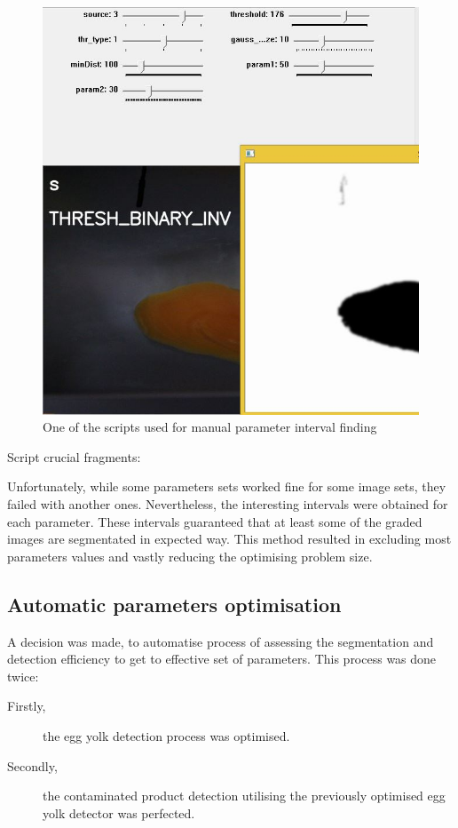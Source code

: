 \documentclass[12pt,twoside,a4paper]{article}
\begin{document}
\begin{figure}[H]
\centering
\includegraphics[width=0.5\paperwidth]{manual}
\caption{One of the scripts used for manual parameter interval finding}\label{fig:manual}
\end{figure}

Script crucial fragments:


Unfortunately, while some parameters sets worked fine for some image sets, they failed with another ones.
Nevertheless, the interesting intervals were obtained for each parameter. These intervals guaranteed that at least some of the graded images are segmentated in expected way.
This method resulted in excluding most parameters values and vastly reducing the optimising problem size.

\subsection{Automatic parameters optimisation}

A decision was made, to automatise process of assessing the segmentation and detection efficiency to get to effective set of parameters.
This process was done twice:
\begin{description}
\item[Firstly,] the egg yolk detection process was optimised.
\item[Secondly,] the contaminated product detection utilising the previously optimised egg yolk detector was perfected.
\end{description}
\end{document}
